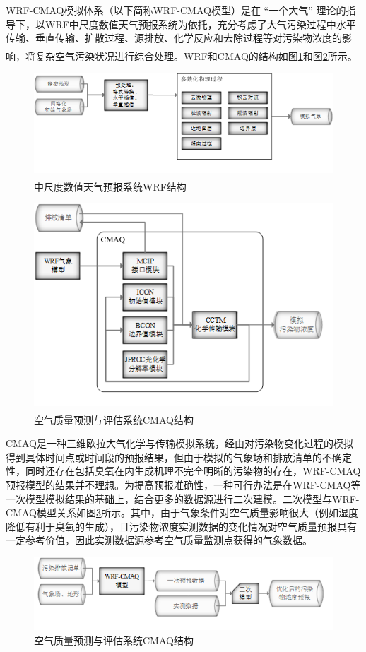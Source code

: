 \documentclass[bwprint]{gmcmthesis}
\numberwithin{figure}{section}
\newcommand{\upcite}[1]{\textsuperscript{\textsuperscript{\cite{#1}}}}
\begin{document}
WRF-CMAQ模拟体系（以下简称WRF-CMAQ模型）是在 “一个大气” 理论的指导下，以WRF中尺度数值天气预报系统为依托，充分考虑了大气污染过程中水平传输、垂直传输、扩散过程、源排放、化学反应和去除过程等对污染物浓度的影响，将复杂空气污染状况进行综合处理\upcite{ref1}。WRF和CMAQ的结构如图\ref{fig1-1}和图\ref{fig1-2}所示。
\begin{figure}[!h]
	\centering
	\includegraphics[width=.7\textwidth]{figures//fig1-1.png}
	\caption{中尺度数值天气预报系统WRF结构\upcite{ref2}}
	\label{fig1-1}
\end{figure}
\begin{figure}[!h]
	\centering
	\includegraphics[width=.7\textwidth]{figures//fig1-2.png}
	\caption{空气质量预测与评估系统CMAQ结构\upcite{ref3}}
	\label{fig1-2}
\end{figure}

CMAQ是一种三维欧拉大气化学与传输模拟系统，经由对污染物变化过程的模拟得到具体时间点或时间段的预报结果，但由于模拟的气象场和排放清单的不确定性，同时还存在包括臭氧在内生成机理不完全明晰的污染物的存在，WRF-CMAQ预报模型的结果并不理想。为提高预报准确性，一种可行办法是在WRF-CMAQ等一次模型模拟结果的基础上，结合更多的数据源进行二次建模。二次模型与WRF-CMAQ模型关系如图\ref{fig1-3}所示。其中，由于气象条件对空气质量影响很大（例如湿度降低有利于臭氧的生成），且污染物浓度实测数据的变化情况对空气质量预报具有一定参考价值，因此实测数据源参考空气质量监测点获得的气象数据。
\begin{figure}[!h]
	\centering
	\includegraphics[width=.7\textwidth]{figures//fig1-3.png}
	\caption{空气质量预测与评估系统CMAQ结构}
	\label{fig1-3}
\end{figure}
\end{document}
